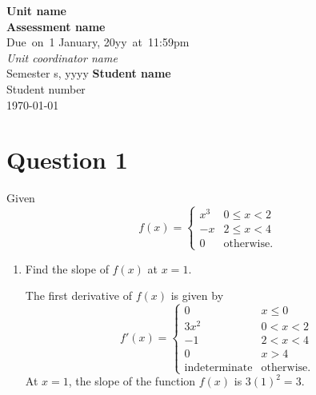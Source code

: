 \documentclass{article}
\date{\today}
\newcommand{\docTitle}{Assessment name}
\newcommand{\dueDate}{1 January, 20yy}
\newcommand{\dueTime}{11:59pm}
\newcommand{\unitName}{Unit name}
\newcommand{\unitTime}{Semester s, yyyy}
\newcommand{\unitInstructorName}{Unit coordinator name}
\newcommand{\authorName}{Student name}
\newcommand{\authorStudentNumber}{Student number}
\begin{document}
\begin{titlepage}
    \vspace{2in}
    \textmd{\textbf{\unitName}} \\
    \vspace{0.1in}
    \textbf{\docTitle} \\
    \vspace{0.1in}
    \small{Due\ on\ \dueDate\ at\ \dueTime} \\
    \vspace{0.1in}
    \large{\textit{\unitInstructorName}} \\
    \vspace{0.1in}
    \unitTime
    \vspace{2in}
    \textbf{\authorName} \\ \authorStudentNumber \\
    \today
\end{titlepage}
\newpage
\section{Question 1}
Given
\begin{equation}
    f\left( x \right) =
    \begin{cases}
        x^3 & 0 \leqslant x < 2 \\
        -x  & 2 \leqslant x < 4 \\
        0   & \text{otherwise}.
    \end{cases}
\end{equation}
\begin{enumerate}[label=(\alph*)]
    \item Find the slope of \(f\left( x \right)\) at \(x = 1\).
          \begin{solution}
              The first derivative of \(f\left( x \right)\) is given by
              \begin{equation*}
                  f'\left( x \right) =
                  \begin{cases}
                      0                    & x \leqslant 0     \\
                      3x^2                 & 0 < x < 2         \\
                      -1                   & 2 < x < 4         \\
                      0                    & x > 4             \\
                      \text{indeterminate} & \text{otherwise}.
                  \end{cases}
              \end{equation*}
              At \(x = 1\), the slope of the function \(f\left( x \right)\) is
              \(3 \left( 1 \right)^2 = 3\).
          \end{solution}
\end{enumerate}
\newpage
\printbibliography
\end{document}
